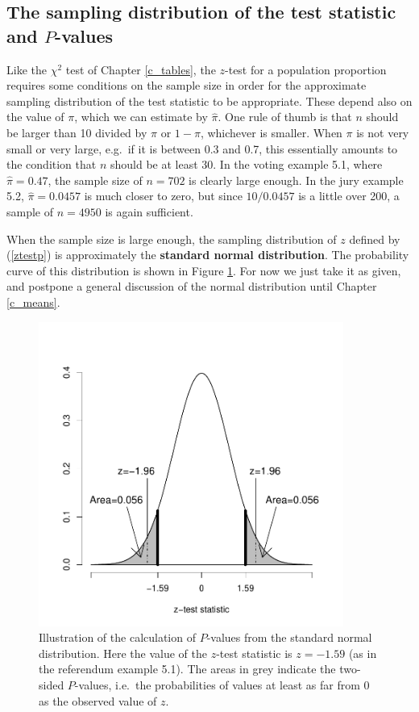 \subsection{The sampling distribution of the test statistic and
$P$-values}
\label{ss-probs-test1sample-samplingd}

\label{p_thumbp}
Like the $\chi^{2}$ test of Chapter \ref{c_tables}, the $z$-test for a
population proportion requires some conditions on the sample size in
order for the approximate sampling distribution of the test statistic to
be appropriate. These depend also on the value of $\pi$, which we can
estimate by $\hat{\pi}$. One rule of thumb is that $n$ should be larger
than 10 divided by $\pi$ or $1-\pi$, whichever is smaller. When $\pi$ is
not very small or very large, e.g.\ if it is between 0.3 and 0.7, this
essentially amounts to the condition that $n$ should be at least 30. In
the voting example 5.1, where $\hat{\pi}=0.47$, the sample size of
$n=702$ is clearly large enough. In the jury example 5.2,
$\hat{\pi}=0.0457$ is much closer to zero, but since $10/0.0457$ is a
little over 200, a sample of $n=4950$ is again sufficient.

When the sample size is large enough, the sampling distribution of $z$
defined by (\ref{ztestp}) is approximately the \textbf{standard normal
distribution}. The probability curve of this distribution is shown in
Figure  \ref{f_pval_prob}. For now we just take it as given, and
postpone a general discussion of the normal distribution
until Chapter \ref{c_means}.

\begin{figure}[t]
\caption{
Illustration of the calculation of $P$-values from the standard normal
distribution. Here the value of the $z$-test statistic is $z=-1.59$ (as
in the referendum example 5.1). The areas in grey indicate the two-sided
$P$-values, i.e.\ the probabilities of values at least as far from 0 as
the observed value of $z$.
}
\label{f_pval_prob}
\begin{center}
\vspace*{-1ex}
\includegraphics[width=10cm]{pval_zp}
\end{center}
\vspace*{-4ex}
\end{figure}

